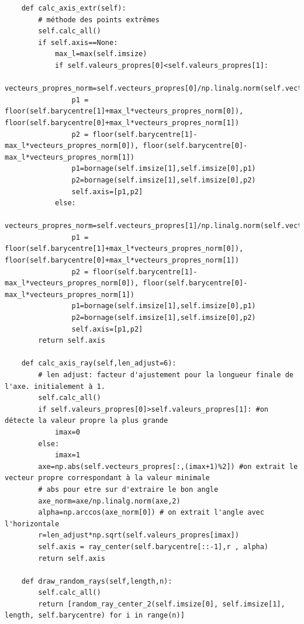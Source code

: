 \documentclass{rapport}
\begin{document}
\begin{lstlisting}
    def calc_axis_extr(self):
        # méthode des points extrêmes
        self.calc_all()
        if self.axis==None:
            max_l=max(self.imsize)
            if self.valeurs_propres[0]<self.valeurs_propres[1]:
                vecteurs_propres_norm=self.vecteurs_propres[0]/np.linalg.norm(self.vecteurs_propres[0])
                p1 = floor(self.barycentre[1]+max_l*vecteurs_propres_norm[0]), floor(self.barycentre[0]+max_l*vecteurs_propres_norm[1])
                p2 = floor(self.barycentre[1]-max_l*vecteurs_propres_norm[0]), floor(self.barycentre[0]-max_l*vecteurs_propres_norm[1])
                p1=bornage(self.imsize[1],self.imsize[0],p1)
                p2=bornage(self.imsize[1],self.imsize[0],p2)
                self.axis=[p1,p2]
            else:
                vecteurs_propres_norm=self.vecteurs_propres[1]/np.linalg.norm(self.vecteurs_propres[1])
                p1 = floor(self.barycentre[1]+max_l*vecteurs_propres_norm[0]), floor(self.barycentre[0]+max_l*vecteurs_propres_norm[1])
                p2 = floor(self.barycentre[1]-max_l*vecteurs_propres_norm[0]), floor(self.barycentre[0]-max_l*vecteurs_propres_norm[1])
                p1=bornage(self.imsize[1],self.imsize[0],p1)
                p2=bornage(self.imsize[1],self.imsize[0],p2)
                self.axis=[p1,p2]
        return self.axis
    
    def calc_axis_ray(self,len_adjust=6):
        # len adjust: facteur d'ajustement pour la longueur finale de l'axe. initialement à 1.
        self.calc_all()
        if self.valeurs_propres[0]>self.valeurs_propres[1]: #on détecte la valeur propre la plus grande
            imax=0 
        else:
            imax=1
        axe=np.abs(self.vecteurs_propres[:,(imax+1)%2]) #on extrait le vecteur propre correspondant à la valeur minimale
        # abs pour etre sur d'extraire le bon angle
        axe_norm=axe/np.linalg.norm(axe,2) 
        alpha=np.arccos(axe_norm[0]) # on extrait l'angle avec l'horizontale
        r=len_adjust*np.sqrt(self.valeurs_propres[imax])
        self.axis = ray_center(self.barycentre[::-1],r , alpha) 
        return self.axis
        
    def draw_random_rays(self,length,n):
        self.calc_all()
        return [random_ray_center_2(self.imsize[0], self.imsize[1], length, self.barycentre) for i in range(n)]
    
\end{lstlisting}
\end{document}

